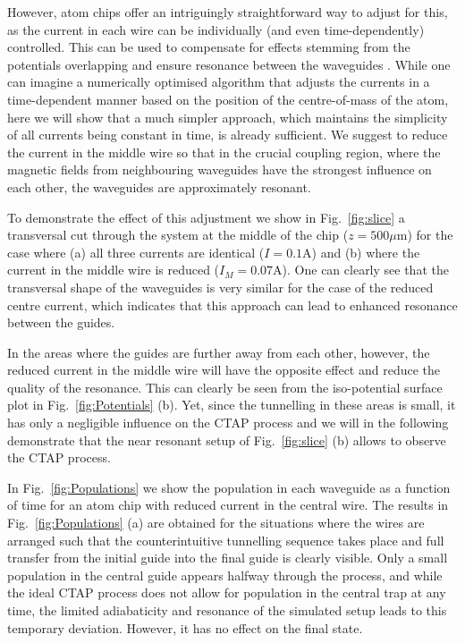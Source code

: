 However, atom chips offer an intriguingly straightforward way to adjust for this, as the current in each wire can be individually (and even time-dependently) controlled. This can be used to compensate for effects stemming from the potentials overlapping and ensure resonance between the waveguides \cite{OSullivan:10}. While one can imagine a numerically optimised algorithm that adjusts the currents in a time-dependent manner based on the position of the centre-of-mass of the atom, here we will show that a much simpler approach, which maintains the simplicity of all currents being constant in time, is already sufficient. We suggest to reduce the current in the middle wire so that in the crucial coupling region, where the magnetic fields from neighbouring waveguides have the strongest influence on each other, the waveguides are approximately resonant. 

To demonstrate the effect of this adjustment we show in Fig.~\ref{fig:slice} a transversal cut through the system at the middle of the chip ($z=500 \mu$m) for the case where (a) all three currents are identical ($I=0.1$A) and (b) where the current in the middle wire is reduced ($I_M=0.07$A). One can clearly see that the transversal shape of the waveguides is very similar for the case of the reduced centre current, which indicates that this approach can lead to enhanced resonance between the guides.

In the areas where the guides are further away from each other, however, the reduced current in the middle wire will have the opposite effect and reduce the quality of the resonance. This can clearly be seen from the iso-potential surface plot in Fig.~\ref{fig:Potentials} (b). Yet, since the tunnelling in these areas is small, it has only a negligible influence on the CTAP process and we will in the following demonstrate that the near resonant setup of Fig.~\ref{fig:slice} (b) allows to observe the CTAP process. 

In Fig.~\ref{fig:Populations} we show the population in each waveguide as a function of time for an atom chip with reduced current in the central wire. The results in Fig.~\ref{fig:Populations} (a) are obtained for the situations where the wires are arranged such that the counterintuitive tunnelling sequence takes place and full transfer from the initial guide into the final guide is clearly visible. Only a small population in the central guide appears halfway through the process, and while the ideal CTAP process does not allow for population in the central trap at any time, the limited adiabaticity and resonance of the simulated setup leads to this temporary deviation. However, it has no effect on the final state.

